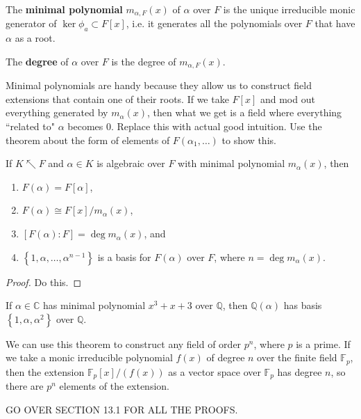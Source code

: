 \documentclass[10pt]{report}
\begin{document}
\begin{defn}[]
	The \textbf{minimal polynomial} $m_{\alpha,F}(x)$ of $\alpha$ over $F$ is the unique irreducible monic generator of $\ker\phi_a \subset F[x]$, i.e. it generates all the polynomials over $F$ that have $\alpha$ as a root.

	The \textbf{degree} of $\alpha$ over $F$ is the degree of $m_{\alpha,F}(x)$.
\end{defn}

Minimal polynomials are handy because they allow us to construct field extensions that contain one of their roots. If we take $F[x]$ and mod out everything generated by $m_{\alpha}(x)$, then what we get is a field where everything ``related to" $\alpha$ becomes 0. {\color{red}Replace this with actual good intuition. Use the theorem about the form of elements of $F(\alpha_1, \dots)$ to show this.}

\begin{thrm}[]
	If $K \nwarrow F$ and $\alpha \in K$ is algebraic over $F$ with minimal polynomial $m_{\alpha}(x)$, then
	\begin{enumerate}
		\item $F(\alpha) = F[\alpha]$,
		\item $F(\alpha) \cong F[x]/m_{\alpha}(x)$,
		\item $[F(\alpha):F] = \deg m_{\alpha}(x)$, and
		\item $\left\{ 1,\alpha,\dots, \alpha^{n-1} \right\}$ is a basis for $F(\alpha)$ over $F$, where $n = \deg m_{\alpha}(x)$.
	\end{enumerate}
\end{thrm}
\begin{proof}
	{\color{red}Do this.}
\end{proof}

\begin{ex}[]
If $\alpha \in \mathbb{C}$ has minimal polynomial $x^3+x+3$ over $\mathbb{Q}$, then $\mathbb{Q}(\alpha)$ has basis $\left\{ 1,\alpha,\alpha^2 \right\}$ over $\mathbb{Q}$.
\end{ex}

We can use this theorem to construct any field of order $p^n$, where $p$ is a prime. If we take a monic irreducible polynomial $f(x)$ of degree $n$ over the finite field $\mathbb{F}_{p}$, then the extension $\mathbb{F}_{p}[x]/(f(x))$ as a vector space over $\mathbb{F}_{p}$ has degree $n$, so there are $p^n$ elements of the extension.

{\color{red}GO OVER SECTION 13.1 FOR ALL THE PROOFS.}
\end{document}

